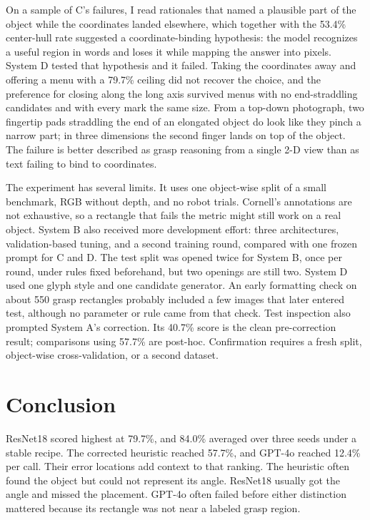 \documentclass[10pt,conference,compsoc]{IEEEtran}
\begin{document}
On a sample of C's failures, I read rationales that named a plausible part of
the object while the coordinates landed elsewhere, which together with the
53.4\% center-hull rate suggested a coordinate-binding hypothesis: the model
recognizes a useful region in words and loses it while mapping the answer
into pixels. System D tested that hypothesis and it failed. Taking the
coordinates away and offering a menu with a 79.7\% ceiling did not recover
the choice, and the preference for closing along the long axis survived
menus with no end-straddling candidates and with every mark the same size.
From a top-down photograph, two fingertip pads straddling the end of an
elongated object do look like they pinch a narrow part; in three dimensions
the second finger lands on top of the object. The failure is better
described as grasp reasoning from a single 2-D view than as text failing to
bind to coordinates.

The experiment has several limits. It uses one object-wise split of a small
benchmark, RGB without depth, and no robot trials. Cornell's annotations are
not exhaustive, so a rectangle that fails the metric might still work on a
real object. System B also received more development effort: three
architectures, validation-based tuning, and a second training round,
compared with one frozen prompt for C and D. The test split was opened
twice for System B, once per round, under rules fixed beforehand, but two
openings are still two. System D used one glyph style and one candidate
generator. An early formatting check on about 550 grasp rectangles probably
included a few images that later entered test, although no parameter or rule
came from that check. Test inspection also prompted System A's correction.
Its 40.7\% score is the clean pre-correction result; comparisons
using 57.7\% are post-hoc. Confirmation requires a fresh split, object-wise
cross-validation, or a second dataset.

\section{Conclusion}

ResNet18 scored highest at 79.7\%, and 84.0\% averaged over three seeds
under a stable recipe. The corrected heuristic reached 57.7\%, and GPT-4o
reached 12.4\% per call. Their error locations add context to that
ranking. The heuristic often found the object but could not represent
its angle. ResNet18 usually got the angle and missed the placement. GPT-4o
often failed before either distinction mattered because its rectangle was not
near a labeled grasp region.
\end{document}
